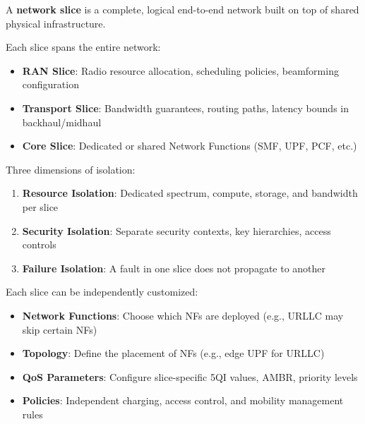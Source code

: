 
A \textbf{network slice} is a complete, logical end-to-end network built on top of shared physical infrastructure.


Each slice spans the entire network:

\begin{itemize}
\tightlist
\item
  \textbf{RAN Slice}: Radio resource allocation, scheduling policies, beamforming configuration
\item
  \textbf{Transport Slice}: Bandwidth guarantees, routing paths, latency bounds in backhaul/\allowbreak{}midhaul
\item
  \textbf{Core Slice}: Dedicated or shared Network Functions (SMF, UPF, PCF, etc.)
\end{itemize}


Three dimensions of isolation:

\begin{enumerate}
\def\labelenumi{\arabic{enumi}.}
\tightlist
\item
  \textbf{Resource Isolation}: Dedicated spectrum, compute, storage, and bandwidth per slice
\item
  \textbf{Security Isolation}: Separate security contexts, key hierarchies, access controls
\item
  \textbf{Failure Isolation}: A fault in one slice does not propagate to another
\end{enumerate}


Each slice can be independently customized:

\begin{itemize}
\tightlist
\item
  \textbf{Network Functions}: Choose which NFs are deployed (e.g., URLLC may skip certain NFs)
\item
  \textbf{Topology}: Define the placement of NFs (e.g., edge UPF for URLLC)
\item
  \textbf{QoS Parameters}: Configure slice-specific 5QI values, AMBR, priority levels
\item
  \textbf{Policies}: Independent charging, access control, and mobility management rules
\end{itemize}

